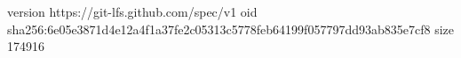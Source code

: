 version https://git-lfs.github.com/spec/v1
oid sha256:6e05e3871d4e12a4f1a37fe2c05313c5778feb64199f057797dd93ab835e7cf8
size 174916
